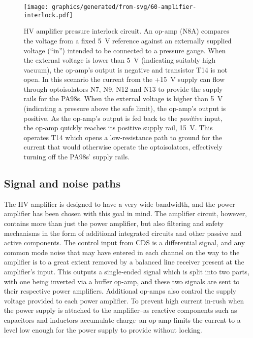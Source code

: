 
\begin{figure}
  \centering
  \texttt{[image: graphics/generated/from-svg/60-amplifier-interlock.pdf]}
  \caption{\gls{HV} amplifier pressure interlock circuit. An op-amp (N8A) compares the voltage from a fixed \SI{5}{\volt} reference against an externally supplied voltage (``in'') intended to be connected to a pressure gauge. When the external voltage is lower than \SI{5}{\volt} (indicating suitably high vacuum), the op-amp's output is negative and transistor T14 is not open. In this scenario the current from the +\SI{15}{\volt} supply can flow through optoisolators N7, N9, N12 and N13 to provide the supply rails for the PA98s. When the external voltage is higher than \SI{5}{\volt} (indicating a pressure above the safe limit), the op-amp's output is positive. As the op-amp's output is fed back to the \emph{positive} input, the op-amp quickly reaches its positive supply rail, \SI{15}{\volt}. This operates T14 which opens a low-resistance path to ground for the current that would otherwise operate the optoisolators, effectively turning off the PA98s' supply rails.}
  \label{fig:amplifier-interlock}
\end{figure}

\subsection{\label{sec:signal-and-noise-paths}Signal and noise paths}
The \gls{HV} amplifier is designed to have a very wide bandwidth, and the power amplifier has been chosen with this goal in mind. The amplifier circuit, however, contains more than just the power amplifier, but also filtering and safety mechanisms in the form of additional integrated circuits and other passive and active components. The control input from \gls{CDS} is a differential signal, and any common mode noise that may have entered in each channel on the way to the amplifier is to a great extent removed by a balanced line receiver present at the amplifier's input. This outputs a single-ended signal which is split into two parts, with one being inverted via a buffer op-amp, and these two signals are sent to their respective power amplifiers. Additional op-amps also control the supply voltage provided to each power amplifier. To prevent high current in-rush when the power supply is attached to the amplifier--as reactive components such as capacitors and inductors accumulate charge--an op-amp limits the current to a level low enough for the power supply to provide without locking.

